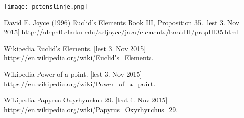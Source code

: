 \documentclass[norsk,twoside,utf8]{article}
\begin{document}
\begin{center}
\texttt{[image: potenslinje.png]}
\end{center}








\begin{thebibliography}{99} %
 
 David E. Joyce (1996)
 \newblock Euclid's Elements Book III, Proposition 35. [lest 3. Nov 2015]
 \newblock \newline
   \small{\url{http://aleph0.clarku.edu/~djoyce/java/elements/bookIII/propIII35.html}}.

 Wikipedia
 \newblock Euclid's Elements. [lest 3. Nov 2015]
 \newblock \newline
   \small{\url{https://en.wikipedia.org/wiki/Euclid's_Elements}}.


 Wikipedia
 \newblock Power of a point. [lest 3. Nov 2015]
 \newblock \newline
   \small{\url{https://en.wikipedia.org/wiki/Power_of_a_point}}.

  Wikipedia
  \newblock Papyrus Oxyrhynchus 29. [lest 4. Nov 2015]
  \newblock \newline
    \small{\url{https://en.wikipedia.org/wiki/Papyrus_Oxyrhynchus_29}}.
 
 
\end{thebibliography}
\end{document}
